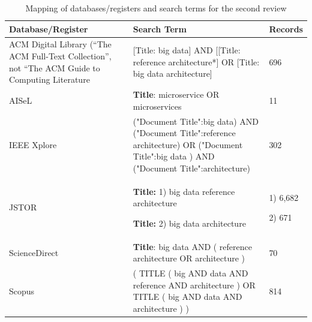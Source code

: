 \documentclass{bmcart}
\begin{document}
\begin{table}
  \renewcommand{\arraystretch}{1.5}
  \caption[]{Mapping of databases/registers and search terms for the second review}
  \begin{tabular}{|p{2.8cm}|p{7cm}|p{1.5cm}|}
      \hline
      Database/Register & Search Term & Records \\ 

      \hline
      ACM Digital Library (“The ACM Full-Text Collection”, not “The ACM Guide to Computing Literature
      &  
      
      [Title: big data] AND [[Title: reference architecture*] OR [Title: big data architecture]

      & 
      696
      
      \\ 

      \hline
      AISeL & \textbf{Title}: microservice OR microservices & 11 \\ 
      \hline

      IEEE Xplore & ("Document Title":big data) AND ("Document Title":reference architecture) OR ("Document Title":big data ) AND ("Document Title":architecture)
      
      & 302  \\ 
      \hline

      JSTOR & 
      
      \textbf{Title:} 1) big data reference architecture 

      \textbf{Title:} 2) big data architecture 
      & 
      
      1) 6,682


      2) 671

      \\ 

      \hline

      ScienceDirect & 
      
    \textbf{Title}: big data AND ( reference architecture OR architecture )

      & 
       70 

      \\ 

      \hline

      Scopus &

      ( TITLE ( big  AND  data  AND  reference  AND  architecture )  OR  TITLE ( big  AND data  AND architecture ) ) 
      
      & 
      
      814 
      

\end{tabular}
\end{table}
\end{document}
